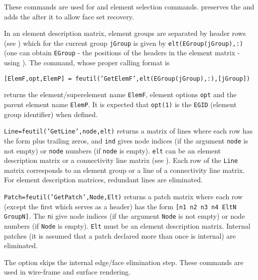 These commands are used for  and  element selection commands.  preserves the  and adds the  after it to allow face set recovery.


 In an element description matrix, element groups are separated by header rows (see ) which for the current group {\tt jGroup} is given by {\tt elt(EGroup(jGroup),:)} (one can obtain {\tt EGroup} - the positions of the headers in the element matrix - using ). The  command, whose proper calling format is

\noindent 
{\tt [ElemF,opt,ElemP] = feutil('GetElemF',elt(EGroup(jGroup),:),[jGroup])}

\noindent returns the element/superelement name {\tt ElemF}, element options {\tt opt} and the parent element name {\tt ElemP}. It is expected that {\tt opt(1)} is the {\tt EGID} (element group identifier) when defined.


{\tt Line=feutil('GetLine',node,elt)} returns a matrix of lines where each row has the form plus trailing zeros, and {\tt ind}  gives node indices (if the argument {\tt node} is not empty) or {\tt node} numbers (if {\tt node} is empty). {\tt elt} can be an element description matrix or a connectivity line matrix (see \feplot).  Each row of the {\tt Line} matrix corresponds to an element group or a line of a connectivity line matrix. For element description matrices, redundant lines are eliminated.

{\tt Patch=feutil('GetPatch',Node,Elt)} returns a patch matrix where each row (except the first which serves as a header) has the form {\tt [n1 n2 n3 n4 EltN GroupN]}.  The {\tt n}{\ti i} give node indices (if the argument {\tt Node} is not empty) or node numbers (if {\tt Node} is empty).  {\tt Elt} must be an element description matrix.  Internal patches (it is assumed that a patch declared more than once is internal) are eliminated.

 The  option skips the internal edge/face elimination step. 
These commands are used in wire-frame and surface rendering.


